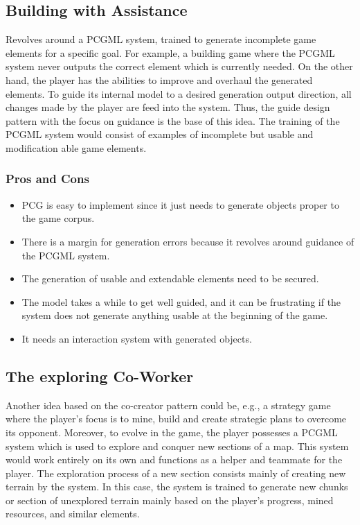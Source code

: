 \documentclass[MGS,Master,english]{twbook}%
\begin{document}
\subsection{Building with Assistance} \label{idea::buildingWithAssistance}
Revolves around a PCGML system, trained to generate incomplete game elements for a specific goal. For example, a building game where the PCGML system never outputs the correct element which is currently needed. On the other hand, the player has the abilities to improve and overhaul the generated elements. To guide its internal model to a desired generation output direction, all changes made by the player are feed into the system. Thus, the guide design pattern with the focus on guidance is the base of this idea. The training of the PCGML system would consist of examples of incomplete but usable and modification able game elements.

\subsubsection{Pros and Cons}
\begin{itemize}
	\item PCG is easy to implement since it just needs to generate objects proper to the game corpus.
	\item There is a margin for generation errors because it revolves around guidance of the PCGML system.
	\item The generation of usable and extendable elements need to be secured.
	\item The model takes a while to get well guided, and it can be frustrating if the system does not generate anything usable at the beginning of the game.
	\item It needs an interaction system with generated objects.
\end{itemize}


\subsection{The exploring Co-Worker} \label{idea::exploringCoWorker}
Another idea based on the co-creator pattern could be, e.g., a strategy game where the player’s focus is to mine, build and create strategic plans to overcome its opponent. Moreover, to evolve in the game, the player possesses a PCGML system which is used to explore and conquer new sections of a map. This system would work entirely on its own and functions as a helper and teammate for the player. The exploration process of a new section consists mainly of creating new terrain by the system. In this case, the system is trained to generate new chunks or section of unexplored terrain mainly based on the player’s progress, mined resources, and similar elements.
\end{document}
